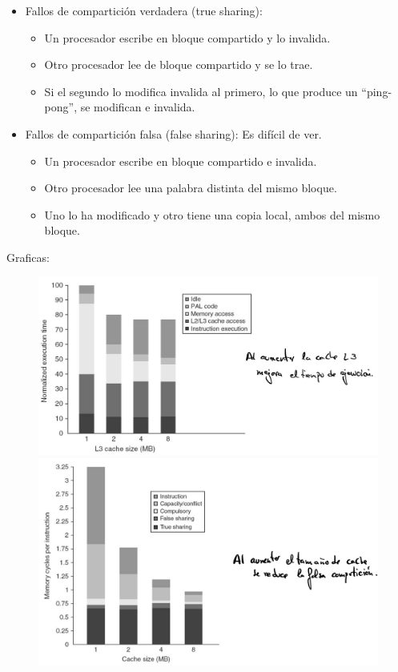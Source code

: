 \documentclass[12pt, twoside, openright]{report} %
\begin{document}
    \begin{itemize}
    
    \item
      Fallos de compartición verdadera (true sharing):

      \begin{itemize}
      
      \item
        Un procesador escribe en bloque compartido y lo invalida.
      \item
        Otro procesador lee de bloque compartido y se lo trae.
      \item
        Si el segundo lo modifica invalida al primero, lo que produce
        un ``ping-pong'', se modifican e invalida.
      \end{itemize}
    \item
      Fallos de compartición falsa (false sharing): Es difícil de ver.

      \begin{itemize}
      
      \item
        Un procesador escribe en bloque compartido e invalida.
      \item
        Otro procesador lee una palabra distinta del mismo bloque.
      \item
        Uno lo ha modificado y otro tiene una copia local, ambos del
        mismo bloque.
      \end{itemize}
    \end{itemize}
\pagebreak
    Graficas:
    \begin{figure}[H]
      {\includegraphics[scale=.15]{Untitled 53.png}\includegraphics[scale=.13]{Untitled 54.png}}
    \end{figure}
\end{document}
